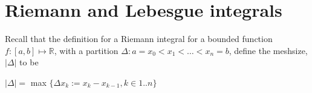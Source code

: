 \documentclass[12pt]{article}
\newcommand{\RR}{\mathbb{R}}      %
\theoremstyle{definition}
\theoremstyle{remark}
\begin{document}
\section{Riemann and Lebesgue integrals}

Recall that the definition for a Riemann integral for a bounded function $f:[a,b]\mapsto\RR$, with a partition $\Delta : a = x_0<x_1<\dots<x_n=b$, define the meshsize, $|\Delta|$ to be
\\

{\centering $|\Delta| = $ max $\{\Delta x_k := x_k - x_{k-1}, k\in 1..n\}$ \par}

\end{document}
